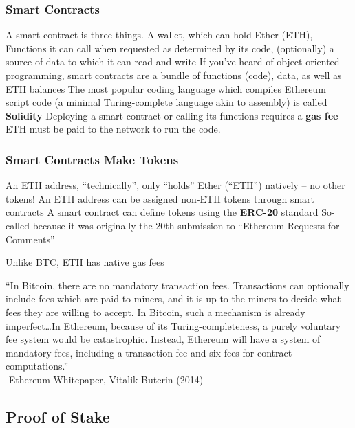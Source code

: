 \documentclass[aspectratio=169]{beamer}
\begin{document}
\begin{frame}
\frametitle{Smart Contracts}

\bi
\m A smart contract is three things.
\bi
\m A wallet, which can hold Ether (ETH),
\m Functions it can call when requested as determined by its code,
\m (optionally) a source of data to which it can read and write \pause 
\ei
\m If you've heard of object oriented programming, smart contracts are a bundle of functions (code), data, as well as ETH balances \pause
\m The most popular coding language which compiles Ethereum script code (a minimal Turing-complete language akin to assembly) is called \textbf{Solidity}  
\ei
Deploying a smart contract or calling its functions requires a \textbf{gas fee} -- ETH must be paid to the network to run the code. 

\end{frame}

\begin{frame}
\frametitle{Smart Contracts Make Tokens}

\bi
\m An ETH address, ``technically'', only ``holds'' Ether (``ETH'') natively -- no other tokens!
\m An ETH address can be assigned non-ETH tokens through smart contracts
\m A smart contract can define tokens using the \textbf{ERC-20} standard 
\bi 
\m So-called because it was originally the 20th submission to ``Ethereum Requests for Comments'' 
\ei 
\ei

\end{frame}


\begin{frame}{Unlike BTC, ETH has native gas fees}

``In Bitcoin, there are no mandatory transaction fees. Transactions can optionally include fees which are paid to miners, and it is up to the miners to decide what fees they are willing to accept. In Bitcoin, such a mechanism is already imperfect\ldots In Ethereum, because of its Turing-completeness, a purely voluntary fee system would be catastrophic. Instead, Ethereum will have a system of mandatory fees, including a transaction fee and six fees for contract computations.'' \\

-Ethereum Whitepaper, Vitalik Buterin (2014)
    
\end{frame}




\subsection{Proof of Stake}
\end{document}
